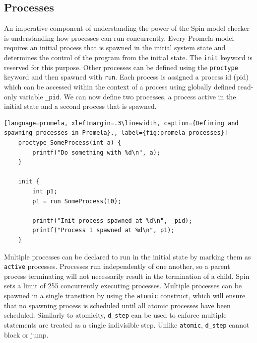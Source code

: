 \subsection{Processes}
An imperative component of understanding the power of the Spin model checker is understanding how processes can run concurrently. Every Promela model requires an initial process that is spawned in the initial system state and determines the control of the program from the initial state. The \texttt{init} keyword is reserved for this purpose. Other processes can be defined using the \texttt{proctype} keyword and then spawned with \texttt{run}. Each process is assigned a process id (pid) which can be accessed within the context of a process using globally defined read-only variable \texttt{\_pid}. We can now define two processes, a process active in the initial state and a second process that is spawned.
\begin{lstlisting}[language=promela, xleftmargin=.3\linewidth, caption={Defining and spawning processes in Promela}., label={fig:promela_processes}]
    proctype SomeProcess(int a) {
        printf("Do something with %d\n", a);
    }
    
    init {
        int p1;
        p1 = run SomeProcess(10);

        printf("Init process spawned at %d\n", _pid);
        printf("Process 1 spawned at %d\n", p1);
    }
\end{lstlisting}
Multiple processes can be declared to run in the initial state by marking them as \texttt{active} processes. Processes run independently of one another, so a parent process terminating will not necessarily result in the termination of a child. Spin sets a limit of 255 concurrently executing processes. Multiple processes can be spawned in a single transition by using the \texttt{atomic} construct, which will ensure that no spawning process is scheduled until all atomic processes have been scheduled. Similarly to atomicity, \texttt{d\_step} can be used to enforce multiple statements are treated as a single indivisible step. Unlike \texttt{atomic}, \texttt{d\_step} cannot block or jump.

